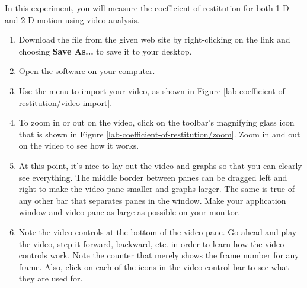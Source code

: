 

\apparatus


\longgoal

In this experiment, you will measure the coefficient of restitution for both 1-D and 2-D motion using video analysis.

\procedure

\begin{enumerate}
	\item Download the file  from the given web site by right-clicking on the link and choosing {\bf Save As...} to save it to your desktop.
	\item Open the  software on your computer.
	\item Use the menu  to import your video, as shown in Figure \ref{lab-coefficient-of-restitution/video-import}.

	
	\item To zoom in or out on the video, click on the toolbar's magnifying glass icon that is shown in Figure \ref{lab-coefficient-of-restitution/zoom}. Zoom in and out on the video to see how it works.
	
	
	\item At this point, it's nice to lay out the video and graphs so that you can clearly see everything. The middle border between panes can be dragged left and right to make the video pane smaller and graphs larger. The same is true of any other bar that separates panes in the window. Make your application window and video pane as large as possible on your monitor.
		
	\item Note the video controls at the bottom of the video pane. Go ahead and play the video, step it forward, backward, etc. in order to learn how the video controls work. Note the counter that merely shows the frame number for any frame. Also, click on each of the icons in the video control bar to see what they are used for.


\end{enumerate}
